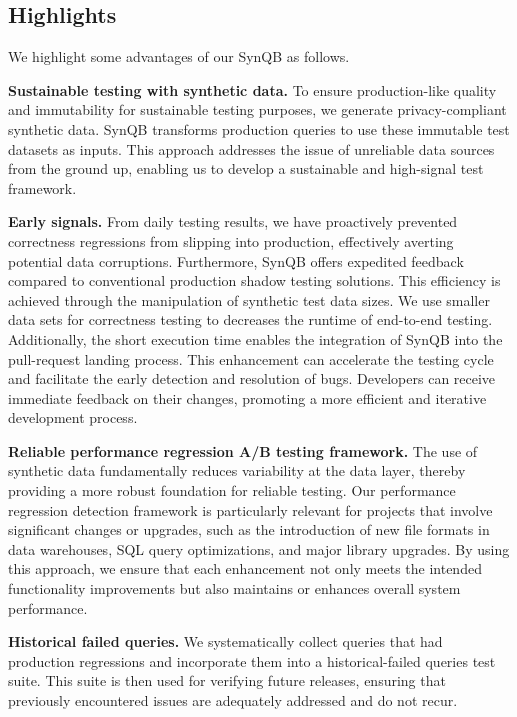 \documentclass[11pt]{article}
\begin{document}
\subsection{Highlights}
We highlight some advantages of our SynQB as follows.

\textbf{Sustainable testing with synthetic data.} To ensure production-like
quality and immutability for sustainable testing purposes, we
generate privacy-compliant synthetic data. SynQB transforms production
queries to use these immutable test datasets as inputs. This
approach addresses the issue of unreliable data sources from the
ground up, enabling us to develop a sustainable and high-signal
test framework.

\textbf{Early signals.} From daily testing results, we have proactively
prevented correctness regressions from slipping into production,
effectively averting potential data corruptions. Furthermore, SynQB
offers expedited feedback compared to conventional production
shadow testing solutions. This efficiency is achieved through the
manipulation of synthetic test data sizes. We use smaller data sets
for correctness testing to decreases the runtime of end-to-end testing.
Additionally, the short execution time enables the integration
of SynQB into the pull-request landing process. This enhancement
can accelerate the testing cycle and facilitate the early detection and
resolution of bugs. Developers can receive immediate feedback on
their changes, promoting a more efficient and iterative development
process.

\textbf{Reliable performance regression A/B testing framework.}
The use of synthetic data fundamentally reduces variability at the
data layer, thereby providing a more robust foundation for reliable
testing. Our performance regression detection framework is
particularly relevant for projects that involve significant changes
or upgrades, such as the introduction of new file formats in data
warehouses, SQL query optimizations, and major library upgrades.
By using this approach, we ensure that each enhancement not only
meets the intended functionality improvements but also maintains
or enhances overall system performance.

\textbf{Historical failed queries.} We systematically collect queries
that had production regressions and incorporate them into a historical-failed
queries test suite. This suite is then used for verifying future
releases, ensuring that previously encountered issues are adequately
addressed and do not recur.
\end{document}
